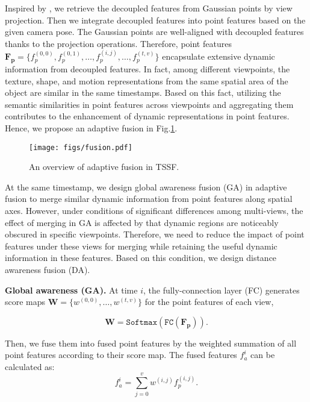 \renewcommand{\thefootnote}{\fnsymbol{footnote}}

Inspired by \cite{melas2023pc2}, we retrieve the decoupled features from Gaussian points by view projection. Then we integrate decoupled features into point features based on the given camera pose. The Gaussian points are well-aligned with decoupled features thanks to the projection operations. Therefore, point features $\textbf{F}_{\textbf{p}}=\{f_p^{(0,0)},f_p^{(0,1)},\dots,f_p^{(i,j)},\dots,f_p^{(t,v)}\}$ encapsulate extensive dynamic information from decoupled features. In fact, among different viewpoints, the texture, shape, and motion representations from the same spatial area of the object are similar in the same timestamps. Based on this fact, utilizing the semantic similarities in point features across viewpoints and aggregating them contributes to the enhancement of dynamic representations in point features. Hence, we propose an adaptive fusion in Fig.\ref{fusion}.

\begin{figure}[t]%
\centering
\texttt{[image: figs/fusion.pdf]}
\caption{An overview of adaptive fusion in TSSF.}\label{fusion}
\end{figure}

At the same timestamp, we design global awareness fusion (GA) in adaptive fusion to merge similar dynamic information from point features along spatial axes. However, under conditions of significant differences among multi-views, the effect of merging in GA is affected by that dynamic regions are noticeably obscured in specific viewpoints. Therefore, we need to reduce the impact of point features under these views for merging while retaining the useful dynamic information in these features. Based on this condition, we design distance awareness fusion (DA).

\textbf{Global awareness (GA).} At time $i$, the fully-connection layer (FC) generates score maps $\textbf{W}=\{w^{(0,0)},\dots,w^{(t,v)}\}$ for the point features of each view,

\begin{equation}
  \label{equ:fc1}
  \textbf{W}=\mathtt{Softmax}(\mathtt{FC}(\textbf{F}_{\textbf{p}})). 
\end{equation} 

Then, we fuse them into fused point features by the weighted summation of all point features according to their score map. The fused features $f_a^i$ can be calculated as:
\begin{equation}
  \label{equ:fc2}
  f_a^i=\sum_{j=0}^{v}{w^{(i,j)}f_p^{(i,j)}}. 
\end{equation} 

